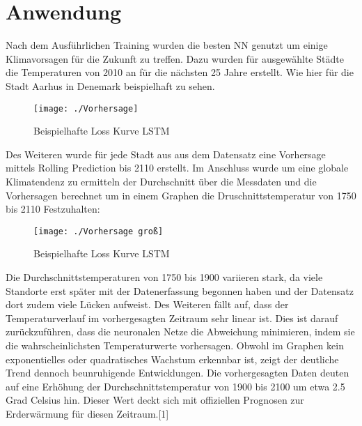 \documentclass[acmtog, authorversion]{acmart} %
\begin{document}
\section{Anwendung}
Nach dem Ausführlichen Training wurden die besten NN genutzt um einige Klimavorsagen für die Zukunft zu treffen. Dazu wurden für ausgewählte Städte die Temperaturen von 2010 an für die nächsten 25 Jahre erstellt. 
Wie hier für die Stadt Aarhus in Denemark beispielhaft zu sehen.
\begin{figure}[H]
    \centering
    \texttt{[image: ./Vorhersage]}
    \label{fig:sub7}
    \caption{Beispielhafte Loss Kurve LSTM}
\end{figure}
Des Weiteren wurde für jede Stadt aus aus dem Datensatz eine Vorhersage mittels Rolling Prediction bis 2110 erstellt. Im Anschluss wurde um eine globale Klimatendenz zu ermitteln der Durchschnitt über die Messdaten und die Vorhersagen berechnet um in einem Graphen die Druschnittstemperatur von 1750 bis 2110 Festzuhalten:
\begin{figure}[H]
    \centering
    \texttt{[image: ./Vorhersage groß]}
    \label{fig:sub7}
    \caption{Beispielhafte Loss Kurve LSTM}
\end{figure}
Die Durchschnittstemperaturen von 1750 bis 1900 variieren stark, da viele Standorte erst später mit der Datenerfassung begonnen haben und der Datensatz dort zudem viele Lücken aufweist. Des Weiteren fällt auf, dass der Temperaturverlauf im vorhergesagten Zeitraum sehr linear ist. Dies ist darauf zurückzuführen, dass die neuronalen Netze die Abweichung minimieren, indem sie die wahrscheinlichsten Temperaturwerte vorhersagen. Obwohl im Graphen kein exponentielles oder quadratisches Wachstum erkennbar ist, zeigt der deutliche Trend dennoch beunruhigende Entwicklungen. Die vorhergesagten Daten deuten auf eine Erhöhung der Durchschnittstemperatur von 1900 bis 2100 um etwa 2.5 Grad Celsius hin. Dieser Wert deckt sich mit offiziellen Prognosen zur Erderwärmung für diesen Zeitraum.[1]
\end{document}
